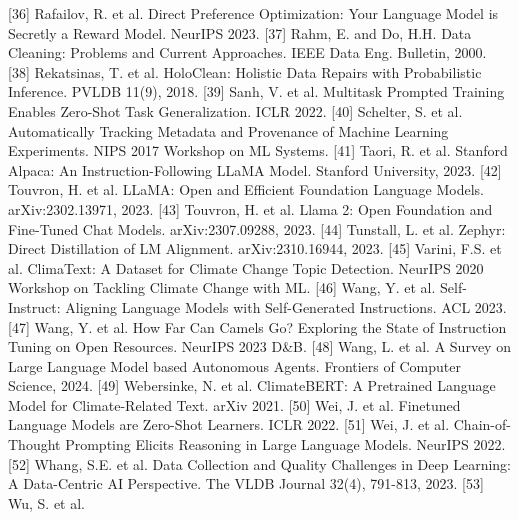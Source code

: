 \documentclass[9pt,twocolumn]{extarticle}
\begin{document}
\protect{}\label{ref_36}{}[36] Rafailov, R. et al.
Direct Preference Optimization: Your Language Model is Secretly a Reward
Model. NeurIPS 2023.
\protect{}\label{ref_37}{}[37] Rahm, E. and Do, H.H.
Data Cleaning: Problems and Current Approaches. IEEE Data Eng. Bulletin,
2000.
\protect{}\label{ref_38}{}[38] Rekatsinas, T. et al.
HoloClean: Holistic Data Repairs with Probabilistic Inference. PVLDB
11(9), 2018.
\protect{}\label{ref_39}{}[39] Sanh, V. et al.
Multitask Prompted Training Enables Zero-Shot Task Generalization. ICLR
2022.
\protect{}\label{ref_40}{}[40] Schelter, S. et al.
Automatically Tracking Metadata and Provenance of Machine Learning
Experiments. NIPS 2017 Workshop on ML Systems.
\protect{}\label{ref_41}{}[41] Taori, R. et al.
Stanford Alpaca: An Instruction-Following LLaMA Model. Stanford
University, 2023.
\protect{}\label{ref_42}{}[42] Touvron, H. et al.
LLaMA: Open and Efficient Foundation Language Models. arXiv:2302.13971,
2023.
\protect{}\label{ref_43}{}[43] Touvron, H. et al. Llama
2: Open Foundation and Fine-Tuned Chat Models. arXiv:2307.09288, 2023.
\protect{}\label{ref_44}{}[44] Tunstall, L. et al.
Zephyr: Direct Distillation of LM Alignment. arXiv:2310.16944, 2023.
\protect{}\label{ref_45}{}[45] Varini, F.S. et al.
ClimaText: A Dataset for Climate Change Topic Detection. NeurIPS 2020
Workshop on Tackling Climate Change with ML.
\protect{}\label{ref_46}{}[46] Wang, Y. et al.
Self-Instruct: Aligning Language Models with Self-Generated
Instructions. ACL 2023.
\protect{}\label{ref_47}{}[47] Wang, Y. et al. How Far
Can Camels Go? Exploring the State of Instruction Tuning on Open
Resources. NeurIPS 2023 D\&B.
\protect{}\label{ref_48}{}[48] Wang, L. et al. A Survey
on Large Language Model based Autonomous Agents. Frontiers of Computer
Science, 2024.
\protect{}\label{ref_49}{}[49] Webersinke, N. et al.
ClimateBERT: A Pretrained Language Model for Climate-Related Text. arXiv
2021.
\protect{}\label{ref_50}{}[50] Wei, J. et al. Finetuned
Language Models are Zero-Shot Learners. ICLR 2022.
\protect{}\label{ref_51}{}[51] Wei, J. et al.
Chain-of-Thought Prompting Elicits Reasoning in Large Language Models.
NeurIPS 2022.
\protect{}\label{ref_52}{}[52] Whang, S.E. et al. Data
Collection and Quality Challenges in Deep Learning: A Data-Centric AI
Perspective. The VLDB Journal 32(4), 791-813, 2023.
\protect{}\label{ref_53}{}[53] Wu, S. et al.
\end{document}

